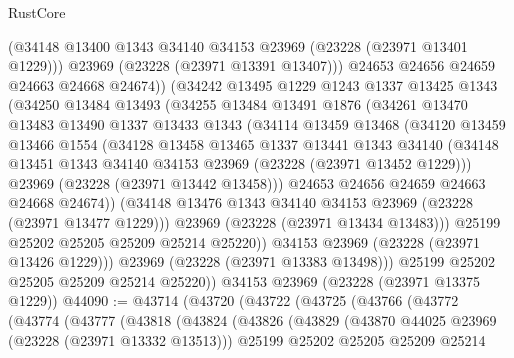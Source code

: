 \begin{lexlean}{RustCore}
\begin{coremodule}
                (@34148 @13400 @1343 @34140 @34153 @23969 (@23228 (@23971 @13401 @1229)))
                @23969
                (@23228 (@23971 @13391 @13407)))
              @24653
              @24656
              @24659
              @24663
              @24668
              @24674))
          (@34242
            @13495
            @1229
            @1243
            @1337
            @13425
            @1343
            (@34250
              @13484
              @13493
              (@34255
                @13484
                @13491
                @1876
                (@34261
                  @13470
                  @13483
                  @13490
                  @1337
                  @13433
                  @1343
                  (@34114
                    @13459
                    @13468
                    (@34120
                      @13459
                      @13466
                      @1554
                      (@34128
                        @13458
                        @13465
                        @1337
                        @13441
                        @1343
                        @34140
                        (@34148 @13451 @1343 @34140 @34153 @23969 (@23228 (@23971 @13452 @1229)))
                        @23969
                        (@23228 (@23971 @13442 @13458)))
                      @24653
                      @24656
                      @24659
                      @24663
                      @24668
                      @24674))
                  (@34148 @13476 @1343 @34140 @34153 @23969 (@23228 (@23971 @13477 @1229)))
                  @23969
                  (@23228 (@23971 @13434 @13483)))
                @25199
                @25202
                @25205
                @25209
                @25214
                @25220))
            @34153
            @23969
            (@23228 (@23971 @13426 @1229)))
          @23969
          (@23228 (@23971 @13383 @13498)))
        @25199
        @25202
        @25205
        @25209
        @25214
        @25220))
    @34153
    @23969
    (@23228 (@23971 @13375 @1229))
@44090 := @43714
    (@43720
      (@43722
        (@43725
          (@43766
            (@43772
              (@43774
                (@43777
                  (@43818
                    (@43824
                      (@43826
                        (@43829
                          (@43870 @44025 @23969 (@23228 (@23971 @13332 @13513)))
                          @25199
                          @25202
                          @25205
                          @25209
                          @25214

\end{coremodule}
\end{lexlean}
